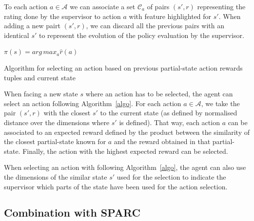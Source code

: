 \documentclass[letterpaper]{article} %
\begin{document}
To each action
$a \in \mathcal{A}$ we can associate a set $\mathcal{C}_{a}$ of pairs $(s',r)$
representing the rating done by the supervisor to action $a$ with feature
highlighted for $s'$. When adding a new pairt $(s',r)$, we can discard all the
previous pairs with an identical $s'$ to represent the evolution of the policy
evaluation by the supervisor.

\begin{algorithm}
    \DontPrintSemicolon
    $\pi(s) = arg\, max_{a} \hat{r}(a)$

    \caption{Algorithm for selecting an action based on previous
    partial-state action rewards tuples and current state}
    \label{algo}
\end{algorithm}


When facing a new state $s$ where an action has to be
selected, the agent can select an action following Algorithm~\ref{algo}. For
each action $a \in \mathcal{A}$, we take the pair $(s',r)$ with the closest $s'$
to the current state (as defined by normalised distance over the dimensions
where $s'$ is defined). That way, each action $a$ can be associated to an
expected reward defined by the product between the similarity of the closest
partial-state known for $a$ and the reward obtained in that partial-state.
Finally, the action with the highest expected reward can be selected.

When selecting an action with following Algorithm~\ref{algo}, the agent can also use
the dimensions of the similar state $s'$ used for the selection to indicate the
supervisor which parts of the state have been used for the action selection.

\subsection{Combination with SPARC}
\end{document}
